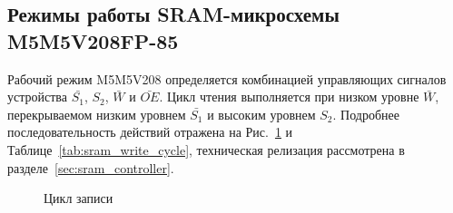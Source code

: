 \subsection{Режимы работы SRAM-микросхемы M5M5V208FP-85}
Рабочий режим M5M5V208 определяется комбинацией управляющих сигналов устройства $\bar{S_1}$, ${S_2}$, $\bar{W}$ и $\bar{OE}$.
Цикл чтения выполняется при низком уровне $\bar{W}$, перекрываемом низким уровнем $\bar{S_1}$ и высоким уровнем ${S_2}$.
Подробнее последовательность действий отражена на Рис.~\ref{pic:sram_write_cycle} и Таблице~\ref{tab:sram_write_cycle},
техническая релизация рассмотрена в разделе~\ref{sec:sram_controller}.

\begin{figure}[H]
\caption{Цикл записи}
\label{pic:sram_write_cycle}
\end{figure}

